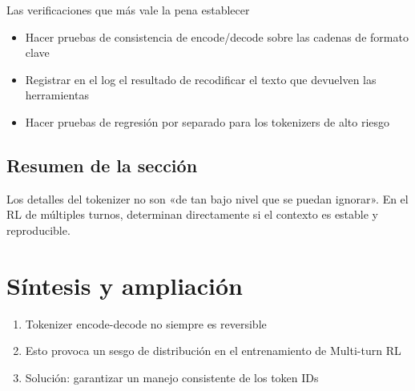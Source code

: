 \documentclass[a4paper]{article}
\begin{document}
\begin{warningbox}{Las verificaciones que más vale la pena establecer}
\begin{itemize}
  \item Hacer pruebas de consistencia de encode/decode sobre las cadenas de formato clave
  \item Registrar en el log el resultado de recodificar el texto que devuelven las herramientas
  \item Hacer pruebas de regresión por separado para los tokenizers de alto riesgo
\end{itemize}
\end{warningbox}

\subsection{Resumen de la sección}
Los detalles del tokenizer no son «de tan bajo nivel que se puedan ignorar». En el RL de múltiples turnos, determinan directamente si el contexto es estable y reproducible.

\newpage
\section{Síntesis y ampliación}
\begin{enumerate}
  \item Tokenizer encode-decode no siempre es reversible
  \item Esto provoca un sesgo de distribución en el entrenamiento de Multi-turn RL
  \item Solución: garantizar un manejo consistente de los token IDs
\end{enumerate}
\end{document}
